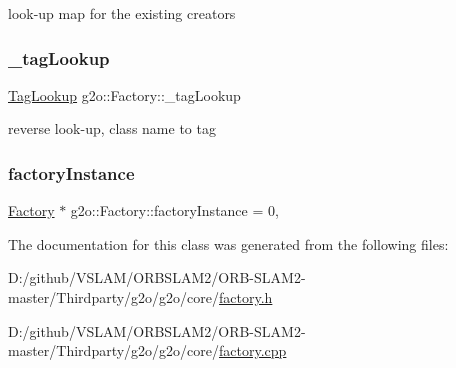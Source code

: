 look-\/up map for the existing creators 

\mbox{\label{classg2o_1_1_factory_a93fbd79ea000ed88101c1f23b19e6e2a}} 
\subsubsection{\texorpdfstring{\+\_\+tag\+Lookup}{\_tagLookup}}
{\footnotesize\ttfamily \mbox{\hyperlink{classg2o_1_1_factory_aba274179c053b3b71dcef6a20c898496}{Tag\+Lookup}} g2o\+::\+Factory\+::\+\_\+tag\+Lookup\hspace{0.3cm}{\ttfamily [protected]}}



reverse look-\/up, class name to tag 

\mbox{\label{classg2o_1_1_factory_a4eab3a865dee18a71bb73246dc3e9f4b}} 
\subsubsection{\texorpdfstring{factory\+Instance}{factoryInstance}}
{\footnotesize\ttfamily \mbox{\hyperlink{classg2o_1_1_factory}{Factory}} $\ast$ g2o\+::\+Factory\+::factory\+Instance = 0\hspace{0.3cm}{\ttfamily [static]}, {\ttfamily [private]}}



The documentation for this class was generated from the following files\+:\begin{DoxyCompactItemize}
\item 
D\+:/github/\+V\+S\+L\+A\+M/\+O\+R\+B\+S\+L\+A\+M2/\+O\+R\+B-\/\+S\+L\+A\+M2-\/master/\+Thirdparty/g2o/g2o/core/\mbox{\hyperlink{factory_8h}{factory.\+h}}\item 
D\+:/github/\+V\+S\+L\+A\+M/\+O\+R\+B\+S\+L\+A\+M2/\+O\+R\+B-\/\+S\+L\+A\+M2-\/master/\+Thirdparty/g2o/g2o/core/\mbox{\hyperlink{factory_8cpp}{factory.\+cpp}}\end{DoxyCompactItemize}
